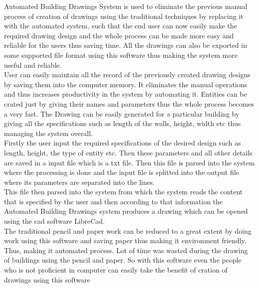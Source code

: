 \noindent Automated Building Drawings System is used to eliminate the previous manual process of creation of drawings using the traditional techniques by replacing it with the automated system, such that the end user can now easily make the required drawing design 
and the whole process can be made more easy and reliable for the users thus saving time. All the drawings can also be exported in some supported file format using this software thus making the system more useful and reliable.\\

\noindent User can easily maintain all the record of the previously created drawing designs by saving them into the computer memory. It eliminates the manual operations and thus
increases productivity in the system by automating it. Entities can be crated just by giving their names and parameters thus the whole process becomes a very fast. The Drawing can be easily generated for a particular building by giving all the specifications such as length of the walls, height, width etc thus managing the system overall. \\

\noindent Firstly the user input the required specifications of the desired design such as length, height, the type of entity etc. Then these parameters and all other details are saved in a input file which is a txt file. Then this file is parsed into the system where the processing is done and the input file is splitted into the output file where its parameters are separated into the lines. \\

\noindent This file then parsed into the system from which the system reads the content that is specified by the user and then according to that information the Automated Building Drawings system produces a drawing which can be opened using the cad software LibreCad.\\

\noindent The traditional pencil and paper work can be reduced to a great extent by doing work using this software and saving paper thus
making it environment friendly. Thus, making it automated process. Lot of time was wasted during the drawing of buildings using the pencil and paper. So with this software even the  people who is not proficient in computer can easily take the benefit of cration of drawings using this software